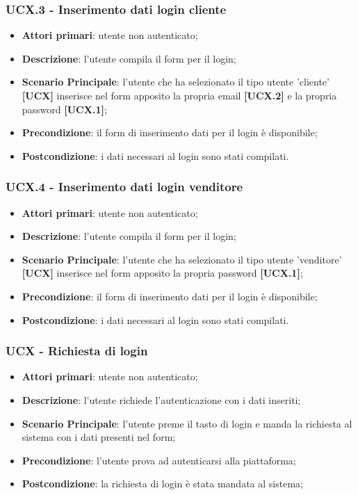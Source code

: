 \subsubsection{UCX.3 - Inserimento dati login cliente}
\begin{itemize}
\item \textbf{Attori primari}: utente non autenticato;
\item \textbf{Descrizione}: l'utente compila il form per il login;
\item \textbf{Scenario Principale}: l'utente che ha selezionato il tipo utente 'cliente' \textbf{[UCX]} inserisce nel form apposito la propria email \textbf{[UCX.2]} e la propria password \textbf{[UCX.1]};
\item \textbf{Precondizione}: il form di inserimento dati per il login è disponibile;
\item \textbf{Postcondizione}: i dati necessari al login sono stati compilati.
\end{itemize}

\subsubsection{UCX.4 - Inserimento dati login venditore}
\begin{itemize}
\item \textbf{Attori primari}: utente non autenticato;
\item \textbf{Descrizione}: l'utente compila il form per il login;
\item \textbf{Scenario Principale}: l'utente che ha selezionato il tipo utente 'venditore' \textbf{[UCX]} inserisce nel form apposito la propria password \textbf{[UCX.1]};
\item \textbf{Precondizione}: il form di inserimento dati per il login è disponibile;
\item \textbf{Postcondizione}: i dati necessari al login sono stati compilati.
\end{itemize}

\subsubsection{UCX - Richiesta di login}
\begin{itemize}
\item \textbf{Attori primari}: utente non autenticato;
\item \textbf{Descrizione}: l'utente richiede l'autenticazione con i dati inseriti;
\item \textbf{Scenario Principale}: l'utente preme il tasto di login e manda la richiesta al sistema con i dati presenti nel form;
\item \textbf{Precondizione}: l'utente prova ad autenticarsi alla piattaforma;
\item \textbf{Postcondizione}: la richiesta di login è stata mandata al sistema;
\end{itemize} 

